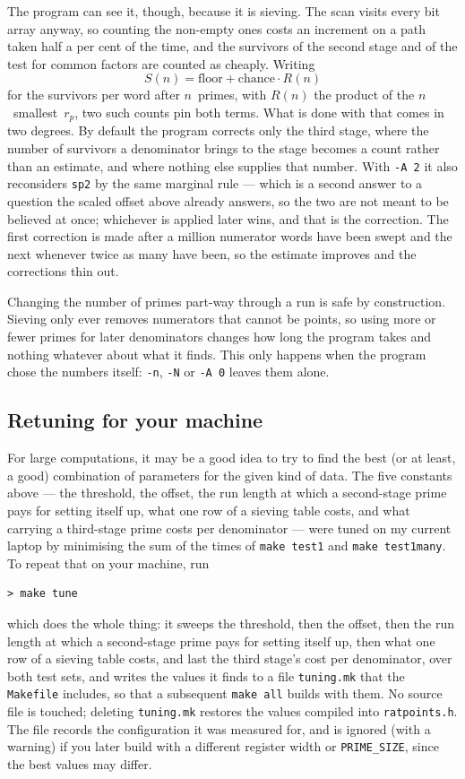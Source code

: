 \documentclass[12pt,a4paper,oneside]{amsart}
\begin{document}
The program can see it, though, because it is sieving. The scan visits every
bit array anyway, so counting the non-empty ones costs an increment on a path
taken half a per cent of the time, and the survivors of the second stage and
of the test for common factors are counted as cheaply. Writing
\[ S(n) = \text{floor} + \text{chance}\cdot R(n) \]
for the survivors per word after $n$~primes, with $R(n)$ the product of the
$n$~smallest~$r_p$, two such counts pin both terms. What is done with that
comes in two degrees. By default the program corrects only the third stage,
where the number of survivors a denominator brings to the stage becomes a
count rather than an estimate, and where nothing else supplies that number.
With \verb+-A 2+ it also reconsiders \texttt{sp2} by the same marginal rule
--- which is a second answer to a question the scaled offset above already
answers, so the two are not meant to be believed at once; whichever is
applied later wins, and that is the correction. The first correction is made after a million
numerator words have been swept and the next whenever twice as many have
been, so the estimate improves and the corrections thin out.

Changing the number of primes part-way through a run is safe by construction.
Sieving only ever removes numerators that cannot be points, so using more or
fewer primes for later denominators changes how long the program takes and
nothing whatever about what it finds. This only happens when the program
chose the numbers itself: \verb+-n+, \verb+-N+ or \verb+-A 0+ leaves them
alone.

\subsection{Retuning for your machine}

For large computations, it may be a good idea to try to find the best
(or at least, a good) combination of parameters for the given kind of data.
The five constants above --- the threshold, the offset, the run length at
which a second-stage prime pays for setting itself up, what one row of a
sieving table costs, and what carrying a third-stage prime costs per
denominator --- were tuned on my current laptop by minimising the
sum of the times of \texttt{make test1} and \texttt{make test1many}. To repeat
that on your machine, run
\begin{verbatim}
> make tune
\end{verbatim}
which does the whole thing: it sweeps the threshold, then the offset, then
the run length at which a second-stage prime pays for setting itself up, then
what one row of a sieving table costs, and last the third stage's cost per
denominator, over both test sets, and writes
the values it finds to a file
\texttt{tuning.mk} that the \texttt{Makefile} includes, so that a subsequent
\texttt{make all} builds with them. No source file is touched; deleting
\texttt{tuning.mk} restores the values compiled into \texttt{ratpoints.h}.
The file records the configuration it was measured for, and is ignored (with a
warning) if you later build with a different register width or
\texttt{PRIME\_SIZE}, since the best values may differ.
\end{document}
